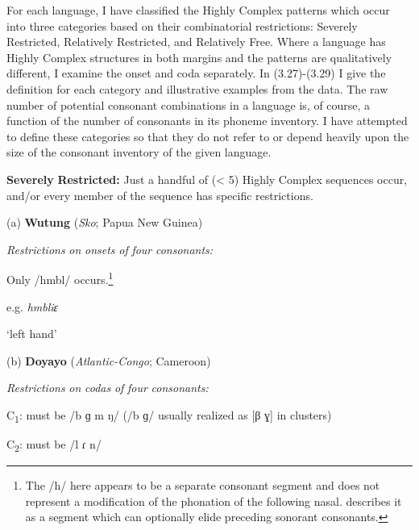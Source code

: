   For each language, I have classified the Highly Complex patterns which occur into three categories based on their combinatorial restrictions: Severely Restricted, Relatively Restricted, and Relatively Free. Where a language has Highly Complex structures in both margins and the patterns are qualitatively different, I examine the onset and coda separately. In (3.27)-(3.29) I give the definition for each category and illustrative examples from the data. The raw number of potential consonant combinations in a language is, of course, a function of the number of consonants in its phoneme inventory. I have attempted to define these categories so that they do not refer to or depend heavily upon the size of the consonant inventory of the given language.



\ea\label{ex:(3.27)}
  \textbf{Severely} \textbf{Restricted:} Just a handful of (< 5) Highly Complex sequences occur, and/or every member of the sequence has specific restrictions.



(a)   \textbf{Wutung} (\textit{Sko}; Papua New Guinea)



\textit{Restrictions} \textit{on} \textit{onsets} \textit{of} \textit{four} \textit{consonants:}



Only /hmbl/ occurs.\footnote{ \textrm{The /h/ here appears to be a separate consonant segment and does not represent a modification of the phonation of the following nasal. \citet[54]{Marmion2010} describes it as a segment which can optionally elide preceding sonorant consonants.}}



e.g.  \textit{hmbliɛ}



    ‘left hand’



\citep[69]{Marmion2010}



(b)   \textbf{Doyayo} (\textit{Atlantic-Congo}; Cameroon)



\textit{Restrictions} \textit{on} \textit{codas} \textit{of} \textit{four} \textit{consonants:}



C\textsubscript{1}: must be /b ɡ m ŋ/ (/b ɡ/ usually realized as [β ɣ] in clusters)



C\textsubscript{2}: must be /l ɾ n/



